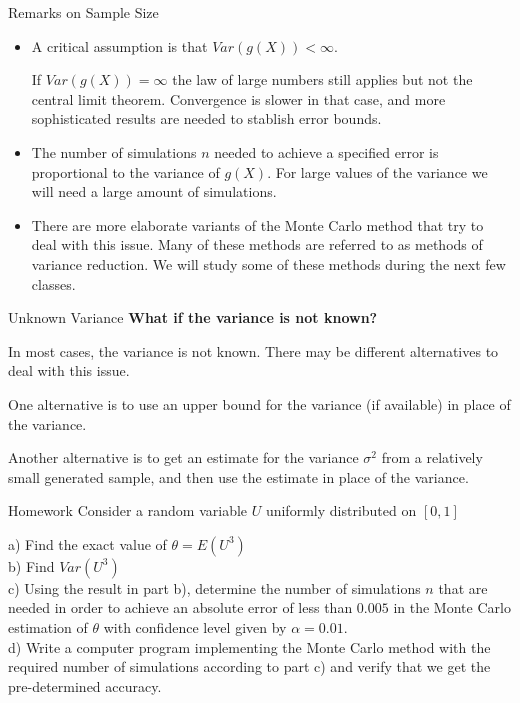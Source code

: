 \documentclass[8pt]{beamer}
\begin{document}
\begin{frame}{Remarks on Sample Size}
\begin{itemize}
\item A critical assumption is that $Var(g(X)) <\infty$. 

If $Var(g(X))=\infty$ the law of large numbers still applies but not the central limit theorem. Convergence is slower in that case, and more sophisticated results are needed to stablish error bounds.

\item The  number of simulations  $n$ needed to achieve a specified error is proportional to the variance of $g(X)$. For large values of the variance we will need a large amount of simulations.

\item There are more elaborate variants of the Monte Carlo method that try to deal with this issue. Many of these methods are referred to as \alert{methods of variance reduction}. We will study some of these methods during the next few classes.
\end{itemize}
\end{frame}

\begin{frame}{Unknown Variance}
\textbf{What if the variance is not known?}

\vspace{2mm}

In most cases, the variance is not known. There may be different alternatives to deal with this issue.

\vspace{2mm}

One alternative is to use an upper bound for the variance (if available) in place of the variance.

\vspace{2mm}

Another alternative is to get an estimate for the variance $\sigma^2$ from a relatively small generated sample, and then use the estimate in place of the variance. 
\end{frame}

\begin{frame}{Homework} 
Consider a random variable $U$ uniformly distributed on $[0,1]$ 

\vspace{3mm}

a) Find the exact value of $\theta= E(U^3)$\\
b) Find $Var(U^3)$\\
c) Using the result in part b), determine the number of simulations $n$ that are needed in order to achieve an absolute error of less than $0.005$ in the Monte Carlo estimation of $\theta$ with confidence level given by $\alpha=0.01$.\\
d) Write a computer program  implementing the Monte Carlo method with the required number of simulations according to part c) and verify that we get the pre-determined accuracy.
\end{frame}
\end{document}
